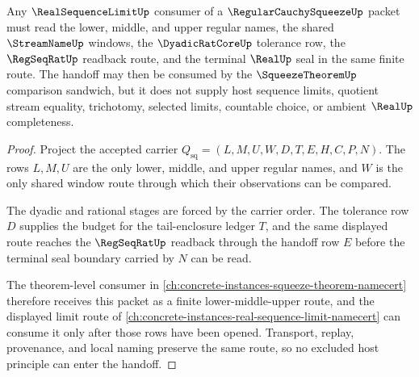 \begin{theorem}
\label{thm:regular-cauchy-squeeze-real-sequence-limit-handoff}
Any $\RealSequenceLimitUp$ consumer of a $\RegularCauchySqueezeUp$ packet must read the lower, middle, and upper regular names, the shared $\StreamNameUp$ windows, the $\DyadicRatCoreUp$ tolerance row, the $\RegSeqRatUp$ readback route, and the terminal $\RealUp$ seal in the same finite route. The handoff may then be consumed by the $\SqueezeTheoremUp$ comparison sandwich, but it does not supply host sequence limits, quotient stream equality, trichotomy, selected limits, countable choice, or ambient $\RealUp$ completeness.
\end{theorem}
\begin{proof}
Project the accepted carrier $Q_{\mathrm{sq}}=(L,M,U,W,D,T,E,H,C,P,N)$. The rows $L,M,U$ are the only lower, middle, and upper regular names, and $W$ is the only shared window route through which their observations can be compared.

The dyadic and rational stages are forced by the carrier order. The tolerance row $D$ supplies the budget for the tail-enclosure ledger $T$, and the same displayed route reaches the $\RegSeqRatUp$ readback through the handoff row $E$ before the terminal seal boundary carried by $N$ can be read.

The theorem-level consumer in \autoref{ch:concrete-instances-squeeze-theorem-namecert} therefore receives this packet as a finite lower-middle-upper route, and the displayed limit route of \autoref{ch:concrete-instances-real-sequence-limit-namecert} can consume it only after those rows have been opened. Transport, replay, provenance, and local naming preserve the same route, so no excluded host principle can enter the handoff.
\end{proof}

